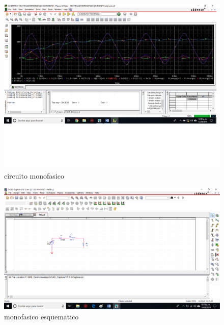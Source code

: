 \documentclass[12pt]{article}
\begin{document}
\begin{figure}[htp]
\centering
\includegraphics[scale=0.50]{monofasico1.png}
\caption{circuito monofasico}
\label{}
\end{figure}


\begin{figure}[htp]
\centering
\includegraphics[scale=0.30]{esquema monofasico1.png}
\caption{monofasico esquematico}
\label{monofasico esquematico}
\end{figure}
\end{document}
